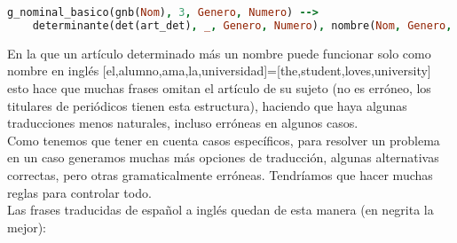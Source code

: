 \documentclass{article}
\begin{document}
\begin{lstlisting}[breaklines=true, language=Prolog]
    g_nominal_basico(gnb(Nom), 3, Genero, Numero) -->
    determinante(det(art_det), _, Genero, Numero), nombre(Nom, Genero, Numero, c).
\end{lstlisting}

En la que un artículo determinado más un nombre puede funcionar solo como nombre en inglés 
[el,alumno,ama,la,universidad]=[the,student,loves,university] esto hace que muchas frases omitan el artículo de su sujeto (no es 
erróneo, los titulares de periódicos tienen esta estructura), haciendo que haya algunas traducciones menos naturales, incluso 
erróneas en algunos casos. \\

Como tenemos que tener en cuenta casos específicos, para resolver un problema en un caso generamos muchas
más opciones de traducción, algunas alternativas correctas, pero otras gramaticalmente erróneas. Tendríamos que hacer muchas 
reglas para controlar todo. \\

Las frases traducidas de español a inglés quedan de esta manera (en negrita la mejor):
\end{document}
